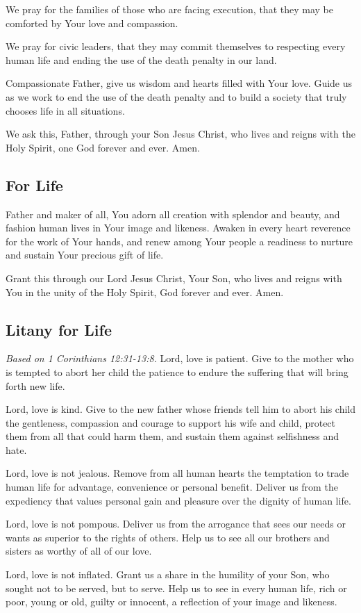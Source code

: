 \documentclass[12pt]{article}
\newcommand{\prayertitle}[1]{\subsection{#1}}
\newcommand{\note}[1]{{\small{\textsl{#1}}}\newline}
\begin{document}
We pray for the families of those who are facing execution, that they may be comforted by Your love and compassion.

We pray for civic leaders, that they may commit themselves to respecting every human life and ending the use of the death penalty in our land.

Compassionate Father, give us wisdom and hearts filled with Your love.
Guide us as we work to end the use of the death penalty and to build a society that truly chooses life in all situations.

We ask this, Father, through your Son Jesus Christ, who lives and reigns with the Holy Spirit, one God forever and ever.
Amen.

\prayertitle{For Life}
Father and maker of all, You adorn all creation with splendor and beauty, and fashion human lives in Your image and likeness.
Awaken in every heart reverence for the work of Your hands, and renew among Your people
a readiness to nurture and sustain Your precious gift of life.

Grant this through our Lord Jesus Christ, Your Son, who lives and reigns with You in 
the unity of the Holy Spirit, God forever and ever.
Amen.
\newpage
\prayertitle{Litany for Life}
\note{Based on 1 Corinthians 12:31-13:8.}
Lord, love is patient.
Give to the mother who is tempted to abort her child the patience to endure the suffering that will bring forth new life.

Lord, love is kind.
Give to the new father whose friends tell him to abort his child the gentleness, compassion and courage to support his wife and child, protect them from all that could harm them, and sustain them against selfishness and hate.

Lord, love is not jealous.
Remove from all human hearts the temptation to trade human life for advantage, convenience or personal benefit.
Deliver us from the expediency that values personal gain and pleasure over the dignity of human life.

Lord, love is not pompous.
Deliver us from the arrogance that sees our needs or wants as superior to the rights of others.
Help us to see all our brothers and sisters as worthy of all of our love.

Lord, love is not inflated.
Grant us a share in the humility of your Son, who sought not to be served, but to serve. Help us to see in every human life, rich or poor, young or old, guilty or innocent, a reflection of your image and likeness. 
\end{document}
